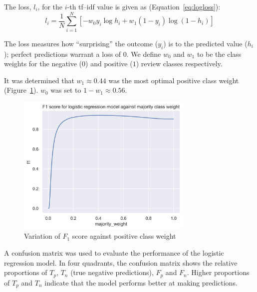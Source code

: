 \documentclass[11pt, a4paper]{pancake-article}
\begin{document}
The loss, \(l_i\), for the \(i\)-th tf--idf value is given as
(Equation~\ref{eq:logloss}):
\begin{equation}
  l_i = \frac{1}{N} \sum^{N}_{i = 1}\left[-w_0 y_i \log h_i +
  w_1\left(1 - y_i\right) \log \left(1 - h_i\right)\right]
  \label{eq:logloss}
\end{equation}

The loss measures how ``surprising'' the outcome ($y_i$) is to the predicted
value ($h_i$); perfect predictions warrant a loss of $0$. We define
$w_0$ and $w_1$
to be the class weights for the negative ($0$) and positive ($1$) review classes
respectively.

It was determined that $w_1 \approx 0.44$ was the most optimal
positive class weight (Figure~\ref{fig:f1-variation}).
$w_0$ was set to $1 - w_1 \approx 0.56$.

\begin{figure}
  \begin{center}
    \includegraphics[width=0.75\textwidth]{../results/logistic_f1.png}
  \end{center}
  \caption{Variation of $F_1$ score against positive class
  weight}\label{fig:f1-variation}
\end{figure}

A confusion matrix was used to evaluate the performance of the
logistic regression model. In
four quadrants, the confusion matrix shows the relative proportions
of $T_p$, $T_n$ (true negative
predictions), $F_p$ and $F_n$. Higher proportions of $T_p$ and $T_n$
indicate that the model performs
better at making predictions.
\end{document}
